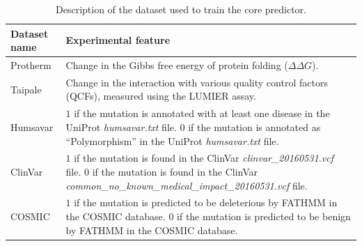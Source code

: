 \begin{table}[ht]
\caption{Description of the dataset used to train the core predictor.} \label{tab:core_datasets}
\begin{tabular}{l | p{13cm}}
	\toprule
	Dataset name & Experimental feature \\
	\midrule
	Protherm \cite{kumar_protherm_2006} & Change in the Gibbs free energy of protein folding ($\Delta \Delta G$). \\
	Taipale \cite{sahni_widespread_2015} & Change in the interaction with various quality control factors (QCFs), measured using the LUMIER assay. \\
	Humsavar \cite{consortium_uniprot:_2015} & $1$ if the mutation is annotated with at least one disease in the UniProt \textit{humsavar.txt} file. $0$ if the mutation is annotated as ``Polymorphism'' in the UniProt \textit{humsavar.txt} file. \\
	ClinVar \cite{landrum_clinvar:_2016} & $1$ if the mutation is found in the ClinVar \textit{clinvar\_20160531.vcf} file. $0$ if the mutation is found in the ClinVar \textit{common\_no\_known\_medical\_impact\_20160531.vcf} file. \\
	COSMIC \cite{forbes_cosmic:_2015} & $1$ if the mutation is predicted to be deleterious by FATHMM in the COSMIC database. $0$ if the mutation is predicted to be benign by FATHMM in the COSMIC database. \\
	\bottomrule
\end{tabular}
\end{table}


